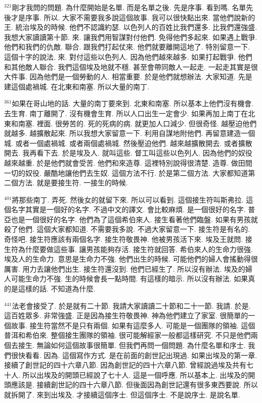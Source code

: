 \documentclass{book}
\begin{document}
$^{321}$剛才我問的問題.
為什麼開始是名單.
而是名單之後.
先是序事.
看到嗎.
名單先後才是序事.
所以.
大家不需要我多說這個故事.
我可以很快點出來.
當他們說新的王.
統治埃及的時候.
他們不認識約瑟.
以色列人的百姓比我們還多.
比我們還強盛.
我想大家讀讀第十節.
來.
讓我們用智謀對付他們.
免得他們多起來.
如果遇上戰爭.
他們和我們的仇敵.
聯合.
跟我們打起仗來.
他們就要離開這地了.
特別留意一下.
這個十字的說法.
來.
對付這些以色列人.
因為他們越來越多.
如果打起戰爭.
他們和其他敵人聯合.
我們這個埃及地就不穩.
甚至會帶同敵人一起走.
一起走其實是很大件事.
因為他們是一個勞動的人.
相當重要.
於是他們就想辦法.
大家知道.
先是建這個處禍城.
在北東和南塞.
所以大量的南丁.

$^{361}$如果在哥山地的話.
大量的南丁要來到.
北東和南塞.
所以基本上他們沒有機會.
去生育.
南丁離開了.
沒有機會生育.
所以人口出生一定會少.
如果再加上南丁在北東和南塞.
裡面.
很勞苦的.
死的死病的病.
就更加人口減少.
但很奇怪.
越壓迫他們就越多.
越擴散起來.
所以我想大家留意一下.
利用自謀地附他們.
再留意建造一個城.
或者一個處禍城.
或者兩個處禍城.
然後壓迫他們.
越來越擴散開去.
或者擴散開去.
我再看下去.
於是埃及人.
就叫這些.
督工叫這些以色列人.
因為他們的奴役越來越重.
於是他們就會受苦.
他們和來造尊.
這裡特別說得很清楚.
造尊.
做田間一切的奴役.
嚴酷地讓他們去生奴.
這個方法不行.
於是第二個方法.
大家都知道第二個方法.
就是要接生符.
一接生的時候.

$^{401}$將那些南丁.
弄死.
然後女的就留下來.
所以可以看到.
這個接生符叫斯弗拉.
這個名字其實是一個好的名字.
不過中文的譯文.
會比較麻煩.
是一個很好的名字.
普亞也是一個很好的名字.
他們為了這個希伯來人.
接生看著他們臨盤.
如果有男孩就殺了他們.
這個大家都知道.
不需要我多說.
不過大家留意一下.
接生符是有名的.
奇怪吧.
接生符應該有兩個名字.
接生符敬畏神.
他被男孩活下來.
埃及王就問.
接生符為什麼要做這些事.
讓男孩能夠存活.
接生符就回答.
希伯來人的生命力很強.
埃及人的生命力.
意思是生命力不強.
他們出生的時候.
可能他們的婦人會搖動得很厲害.
用力去讓他們出生.
接生符還沒到.
他們已經生了.
所以沒有辦法.
埃及的婦人可能生命力不強.
生的時候會長一點時間.
有這樣的暗示.
所以沒有辦法.
如果真的是這樣的話.
不知道為什麼.

$^{441}$法老會接受了.
於是就有二十節.
我請大家讀讀二十節和二十一節.
我請.
於是.
這百姓眾多.
非常強盛.
正是因為接生符敬畏神.
神為他們建立了家室.
很簡單的一個故事.
接生符當然不是只有兩個.
如果有這麼多人.
可能是一個團隊的領袖.
這個普洱和希伯來.
整個接生團隊的領袖.
很可能解經家一般都這樣研究.
不只是他們兩個去接生.
無論如何這個故事很簡單.
但我們再問一個問題.
為什麼名單和序士.
我們很快看看.
因為.
這個寫作方式.
是在前面的創世記出現過.
如果出埃及的第一章.
接續了創世記的四十六章八節.
因為創世記的四十六章八節.
曾經說過埃及共有七十人.
所以出埃及的開頭已經說了七十人.
這是一個呼應.
所以基本上.
出埃及的開頭應該是.
接續創世記的四十六章八節.
但後面因為創世記還有很多東西要說.
所以就拆開了.
來到出埃及.
才接續這個序士.
但這個序士.
不是說序士.
是說名單.
\end{document}
